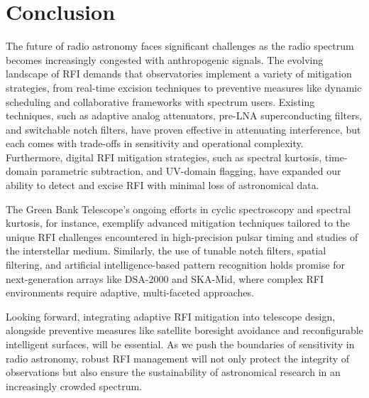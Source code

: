 \section{Conclusion}
\label{section:hardware:conclusion}

The future of radio astronomy faces significant challenges as the radio spectrum becomes increasingly congested with anthropogenic signals. The evolving landscape of RFI demands that observatories implement a variety of mitigation strategies, from real-time excision techniques to preventive measures like dynamic scheduling and collaborative frameworks with spectrum users. Existing techniques, such as adaptive analog attenuators, pre-LNA superconducting filters, and switchable notch filters, have proven effective in attenuating interference, but each comes with trade-offs in sensitivity and operational complexity. Furthermore, digital RFI mitigation strategies, such as spectral kurtosis, time-domain parametric subtraction, and UV-domain flagging, have expanded our ability to detect and excise RFI with minimal loss of astronomical data.

The Green Bank Telescope’s ongoing efforts in cyclic spectroscopy and spectral kurtosis, for instance, exemplify advanced mitigation techniques tailored to the unique RFI challenges encountered in high-precision pulsar timing and studies of the interstellar medium. Similarly, the use of tunable notch filters, spatial filtering, and artificial intelligence-based pattern recognition holds promise for next-generation arrays like DSA-2000 and SKA-Mid, where complex RFI environments require adaptive, multi-faceted approaches.

Looking forward, integrating adaptive RFI mitigation into telescope design, alongside preventive measures like satellite boresight avoidance and reconfigurable intelligent surfaces, will be essential. As we push the boundaries of sensitivity in radio astronomy, robust RFI management will not only protect the integrity of observations but also ensure the sustainability of astronomical research in an increasingly crowded spectrum.